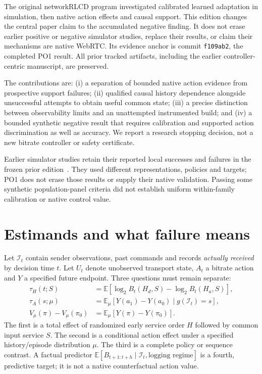 \documentclass[10pt]{article}
\begin{document}
The original networkRLCD program investigated calibrated learned adaptation in
simulation, then native action effects and causal support. This edition changes
the central paper claim to the accumulated negative finding. It does not erase
earlier positive or negative simulator studies, replace their results, or claim
their mechanisms are native WebRTC. Its evidence anchor is commit
\texttt{f109ab2}, the completed PO1 result. All prior tracked artifacts, including
the earlier controller-centric manuscript, are preserved.

The contributions are: (i) a separation of bounded native action evidence from
prospective support failures; (ii) qualified causal history dependence alongside
unsuccessful attempts to obtain useful common state; (iii) a precise distinction
between observability limits and an unattempted instrumented build; and (iv) a
bounded synthetic negative result that requires calibration and supported action
discrimination as well as accuracy. We report a research stopping decision,
not a new bitrate controller or safety certificate.

Earlier simulator studies retain their reported local successes and failures
in the frozen prior edition~\cite{earlier}. They used different representations,
policies and targets; PO1 does not erase those results or supply their native
validation. Passing some synthetic population-panel criteria did not establish
uniform within-family calibration or native control value.

\section{Estimands and what failure means}
\label{sec:estimands}
Let $\mathcal I_t$ contain sender observations, past commands and records
\emph{actually received} by decision time $t$. Let $U_t$ denote unobserved
transport state, $A_t$ a bitrate action and $Y$ a specified future endpoint.
Three questions must remain separate:
\begin{align}
\tau_H(t;S)&=\mathbb E[\log_2 B_t(H_d,S)-\log_2 B_t(H_a,S)],\\
\tau_A(s;\mu)&=\mathbb E_{\mu}[Y(a_1)-Y(a_0)\mid g(\mathcal I_t)=s],\\
V_{\mu}(\pi)-V_{\mu}(\pi_0)&=\mathbb E_{\mu}[Y(\pi)-Y(\pi_0)].
\end{align}
The first is a total effect of randomized early service order $H$ followed by
common input service $S$. The second is a conditional action effect under a
specified history/episode distribution $\mu$. The third is a complete policy
or sequence contrast. A factual predictor
$\mathbb E[B_{t+1:t+h}\mid\mathcal I_t,\text{logging regime}]$ is a fourth,
predictive target; it is not a native counterfactual action value.
\end{document}
